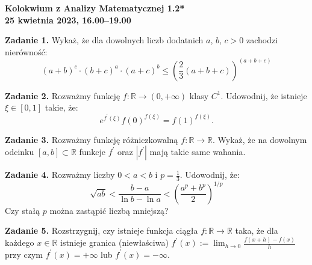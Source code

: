 \documentclass[12pt,a4paper]{article}
\begin{document}
\begin{center}
    \Large \textbf{Kolokwium z Analizy Matematycznej 1.2*} \\
    \vspace{0.2cm}
    \normalsize \textbf{25 kwietnia 2023, 16.00--19.00}
\end{center}

\vspace{0.8cm}

\noindent\textbf{Zadanie 1.} Wykaż, że dla dowolnych liczb dodatnich $a$, $b$, $c>0$ zachodzi nierówność:
\[
(a+b)^{c}\cdot(b+c)^{a}\cdot(a+c)^{b}\le\left(\frac{2}{3}(a+b+c)\right)^{(a+b+c)}
\]

\vspace{0.5cm}

\noindent\textbf{Zadanie 2.} Rozważmy funkcję $f:\mathbb{R}\rightarrow(0,+\infty)$ klasy $C^{1}$. Udowodnij, że istnieje $\xi\in[0,1]$ takie, że:
\[
e^{f^{\prime}(\xi)}f(0)^{f(\xi)}=f(1)^{f(\xi)}.
\]

\vspace{0.5cm}

\noindent\textbf{Zadanie 3.} Rozważmy funkcję różniczkowalną $f:\mathbb{R}\rightarrow\mathbb{R}$. Wykaż, że na dowolnym odcinku $[a,b]\subset\mathbb{R}$ funkcje $f^{\prime}$ oraz $|f^{\prime}|$ mają takie same wahania.

\vspace{0.5cm}

\noindent\textbf{Zadanie 4.} Rozważmy liczby $0<a<b$ i $p=\frac{1}{3}$. Udowodnij, że:
\[
\sqrt{ab}<\frac{b-a}{\ln b-\ln a}<\left(\frac{a^{p}+b^{p}}{2}\right)^{1/p}
\]
Czy stałą $p$ można zastąpić liczbą mniejszą?

\vspace{0.5cm}

\noindent\textbf{Zadanie 5.} Rozstrzygnij, czy istnieje funkcja ciągła $f:\mathbb{R}\rightarrow\mathbb{R}$ taka, że dla każdego $x\in\mathbb{R}$ istnieje granica (niewłaściwa) $f^{\prime}(x):=\lim_{h\rightarrow0}\frac{f(x+h)-f(x)}{h}$ przy czym $f^{\prime}(x)=+\infty$ lub $f^{\prime}(x)=-\infty$.
\end{document}
